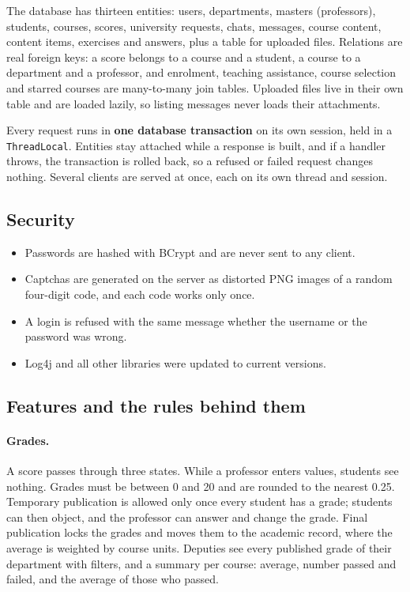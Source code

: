 \documentclass[11pt,a4paper]{article}
\begin{document}
The database has thirteen entities: users, departments, masters (professors), students, courses, scores, university requests, chats, messages, course content, content items, exercises and answers, plus a table for uploaded files. Relations are real foreign keys: a score belongs to a course and a student, a course to a department and a professor, and enrolment, teaching assistance, course selection and starred courses are many-to-many join tables. Uploaded files live in their own table and are loaded lazily, so listing messages never loads their attachments.

Every request runs in \textbf{one database transaction} on its own session, held in a \texttt{ThreadLocal}. Entities stay attached while a response is built, and if a handler throws, the transaction is rolled back, so a refused or failed request changes nothing. Several clients are served at once, each on its own thread and session.

\subsection{Security}

\begin{itemize}
\item Passwords are hashed with BCrypt and are never sent to any client.
\item Captchas are generated on the server as distorted PNG images of a random four-digit code, and each code works only once.
\item A login is refused with the same message whether the username or the password was wrong.
\item Log4j and all other libraries were updated to current versions.
\end{itemize}

\subsection{Features and the rules behind them}

\paragraph{Grades.} A score passes through three states. While a professor enters values, students see nothing. Grades must be between 0 and 20 and are rounded to the nearest 0.25. Temporary publication is allowed only once every student has a grade; students can then object, and the professor can answer and change the grade. Final publication locks the grades and moves them to the academic record, where the average is weighted by course units. Deputies see every published grade of their department with filters, and a summary per course: average, number passed and failed, and the average of those who passed.
\end{document}
